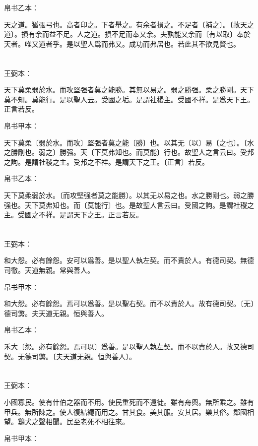 \documentclass[a5paper]{ctexbook}
\begin{document}
    帛书乙本：

    天之道。猶張弓也。高者印之。下者舉之。有余者損之。不足者〔補之〕。〔故天之道〕。損有余而益不足。人之道。損不足而奉又余。夫孰能又余而〔有以取〕奉於天者。唯又道者乎。是以聖人爲而弗又。成功而弗居也。若此其不欲見賢也。

    \chapter{}
    王弼本：

    天下莫柔弱於水。而攻堅强者莫之能勝。其無以易之。弱之勝强。柔之勝剛。天下莫不知。莫能行。是以聖人云。受國之垢。是謂社稷主。受國不祥。是爲天下王。正言若反。

    
    帛书甲本：

    天下莫柔〔弱於水。而攻〕堅强者莫之能〔勝〕也。以其无〔以〕易〔之也〕。〔水之勝剛也。弱之〕勝强。天〔下莫弗知也。而莫能〕行也。故聖人之言云曰。受邦之訽。是謂社稷之主。受邦之不祥。是謂天下之王。〔正言〕若反。

    帛书乙本：

    天下莫柔弱於水。〔而攻堅强者莫之能勝〕。以其无以易之也。水之勝剛也。弱之勝强也。天下莫弗知也。而〔莫能行〕也。是故聖人言云曰。受國之訽。是謂社稷之主。受國之不祥。是謂天下之王。正言若反。

    \chapter{}
    王弼本：

    和大怨。必有餘怨。安可以爲善。是以聖人執左契。而不責於人。有德司契。無德司徹。天道無親。常與善人。

    
    帛书甲本：

    和大怨。必有餘怨。焉可以爲善。是以聖右契。而不以責於人。故有德司契。〔无〕德司勶。夫天道无親。恒與善人。

    帛书乙本：

    禾大〔怨。必有餘怨。焉可以〕爲善。是以聖人執左契。而不以責於人。故又德司契。无德司勶。〔夫天道无親。恒與善人〕。

    \chapter{}
    王弼本：

    小國寡民。使有什伯之器而不用。使民重死而不遠徙。雖有舟輿。無所乘之。雖有甲兵。無所陳之。使人復結繩而用之。甘其食。美其服。安其居。樂其俗。鄰國相望。鷄犬之聲相聞。民至老死不相往來。

    
    帛书甲本：
\end{document}
